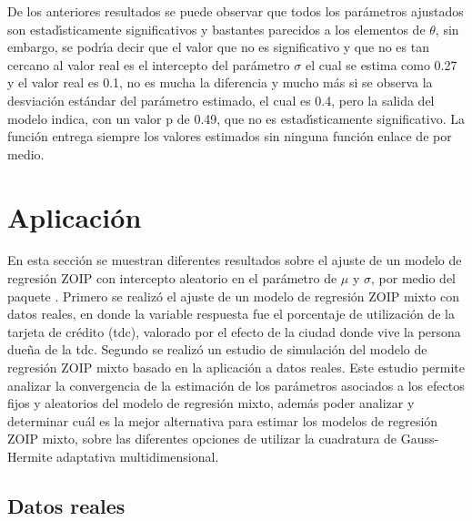 De los anteriores resultados se puede observar que todos los par\'{a}metros ajustados son estad\'{\i}sticamente significativos y bastantes parecidos a los elementos de $\theta$, sin embargo, se podr\'{\i}a decir que el valor que no es significativo y que no es tan cercano al valor real es el intercepto del par\'{a}metro $\sigma$ el cual se estima como 0.27 y el valor real es 0.1, no es mucha la diferencia y mucho m\'{a}s si se observa la desviaci\'{o}n est\'{a}ndar del par\'{a}metro estimado, el cual es 0.4, pero la salida del modelo indica, con un valor p de 0.49, que no es estad\'{\i}sticamente significativo. La funci\'{o}n  entrega siempre los valores estimados sin ninguna funci\'{o}n enlace de por medio.
 
\section{Aplicaci\'{o}n}

En esta secci\'{o}n se muestran diferentes resultados sobre el ajuste de un modelo de regresi\'{o}n ZOIP con intercepto aleatorio en el par\'{a}metro de $\mu$ y $\sigma$, por medio del paquete . Primero se realiz\'{o} el ajuste de un modelo de regresi\'{o}n ZOIP mixto con datos reales, en donde la variable respuesta fue el porcentaje de utilizaci\'{o}n de la tarjeta de cr\'{e}dito (tdc), valorado por el efecto de la ciudad donde vive la persona due\~{n}a de la tdc. Segundo se realiz\'{o} un estudio de simulaci\'{o}n del modelo de regresi\'{o}n ZOIP mixto basado en la aplicaci\'{o}n a datos reales. Este estudio permite analizar la convergencia de la estimaci\'{o}n de los pa\-r\'{a}\-me\-tros asociados a los efectos fijos y aleatorios del modelo de regresi\'{o}n mixto, adem\'{a}s poder analizar y determinar cu\'{a}l es la mejor alternativa para estimar los modelos de regresi\'{o}n ZOIP mixto, sobre las diferentes opciones de utilizar la cuadratura de Gauss-Hermite adaptativa multidimensional.

\subsection{Datos reales}

